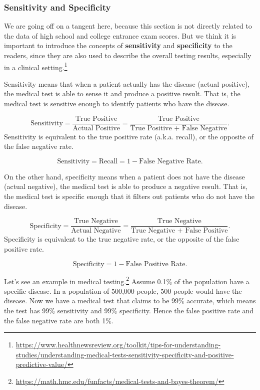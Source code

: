 \documentclass[
]{article}
\begin{document}
\subsubsection{Sensitivity and Specificity}

We are going off on a tangent here, because this section is not directly
related to the data of high school and college entrance exam scores. But
we think it is important to introduce the concepts of
\textbf{sensitivity} and \textbf{specificity} to the readers, since they
are also used to describe the overall testing results, especially in a
clinical setting.\footnote{\url{https://www.healthnewsreview.org/toolkit/tips-for-understanding-studies/understanding-medical-tests-sensitivity-specificity-and-positive-predictive-value/}}

Sensitivity means that when a patient actually has the disease (actual
positive), the medical test is able to sense it and produce a positive
result. That is, the medical test is sensitive enough to identify
patients who have the disease.

\[\text{Sensitivity} = \dfrac{\text{True Positive}}{\text{Actual Positive}} = \dfrac{\text{True Positive}}{\text{True Positive + False Negative}}.\]
Sensitivity is equivalent to the true positive rate (a.k.a. recall), or
the opposite of the false negative rate.

\[\text{Sensitivity} = \text{Recall} = 1 - \text{False Negative Rate}.\]

On the other hand, specificity means when a patient does not have the
disease (actual negative), the medical test is able to produce a
negative result. That is, the medical test is specific enough that it
filters out patients who do not have the disease.

\[\text{Specificity} = \dfrac{\text{True Negative}}{\text{Actual Negative}} = \dfrac{\text{True Negative}}{\text{True Negative + False Positive}}.\]
Specificity is equivalent to the true negative rate, or the opposite of
the false positive rate.

\[\text{Specificity} = 1 - \text{False Positive Rate}.\]

Let's see an example in medical testing.\footnote{\url{https://math.hmc.edu/funfacts/medical-tests-and-bayes-theorem/}}
Assume 0.1\% of the population have a specific disease. In a population
of 500,000 people, 500 people would have the disease. Now we have a
medical test that claims to be 99\% accurate, which means the test has
99\% sensitivity and 99\% specificity. Hence the false positive rate and
the false negative rate are both 1\%.
\end{document}
